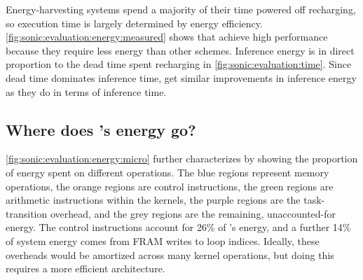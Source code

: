 Energy-harvesting systems spend a majority of their time powered off
recharging, so execution time is largely determined by energy
efficiency.
%
\autoref{fig:sonic:evaluation:energy:measured} shows that \sonictails achieve high performance 
because they require less energy than other schemes.
%
Inference energy is in direct proportion to the dead
time spent recharging in \autoref{fig:sonic:evaluation:time}.
%
Since dead time dominates inference time, \sonictails get similar
improvements in inference energy as they do in terms of inference
time.

\figSONICEvalMicro

\subsection{Where does \sonic's energy go?}
\autoref{fig:sonic:evaluation:energy:micro} further characterizes \sonic by showing 
the proportion of energy spent on different operations. 
%
The blue regions represent memory operations, the orange regions are control
instructions, the green regions are arithmetic instructions within the kernels,
the purple regions are the task-transition overhead, and the grey regions
are the remaining, unaccounted-for energy. 
%
The control instructions account for 26\% of \sonic's energy,
and a further 14\% of system energy comes from FRAM writes to loop indices.
Ideally, these overheads would be amortized across many kernel operations,
but doing this requires a more efficient architecture.
